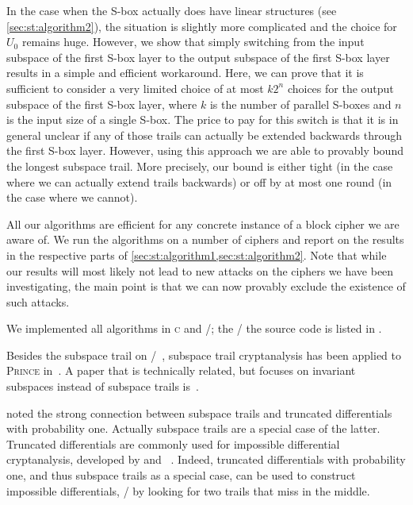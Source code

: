 In the case when the S-box actually does have linear structures (see \cref{sec:st:algorithm2}), the situation is slightly more complicated and the choice for $U_0$ remains huge.
However, we show that simply switching from the input subspace of the first S-box layer to the output subspace of the first S-box layer results in a simple and efficient workaround.
Here, we can prove that it is sufficient to consider a very limited choice of at most $k2^n$ choices for the output subspace of the first S-box layer, where $k$ is the number of parallel S-boxes and $n$ is the input size of a single S-box.
The price to pay for this switch is that it is in general unclear if any of those trails can actually be extended backwards through the first S-box layer.
However, using this approach we are able to provably bound the longest subspace trail.
More precisely, our bound is either tight (in the case where we can actually extend trails backwards) or off by at most one round (in the case where we cannot).

All our algorithms are efficient for any concrete instance of a block cipher we are aware of.
We run the algorithms on a number of ciphers and report on the results in the respective parts of \cref{sec:st:algorithm1,sec:st:algorithm2}.
Note that while our results will most likely not lead to new attacks on the ciphers we have been investigating, the main point is that we can now provably exclude the existence of such attacks.

We implemented all algorithms in \textsc{c} and \sage/; the \sage/ the source code is listed in
\cite[Appendix~A]{ToSC:LeaTezWie18}%
.

Besides the subspace trail on \AES/~\cite{EC:GraRecRon17}, subspace trail cryptanalysis has been applied to \textsc{Prince} in~\cite{INDOCRYPT:GraRec16}.
A paper that is technically related, but focuses on invariant subspaces instead of subspace trails is~\cite{EPRINT:LiuRij17}.

\textcite{ToSC:GraRecRon16} noted the strong connection between subspace trails and truncated differentials with probability one.
Actually subspace trails are a special case of the latter.
Truncated differentials are commonly used for impossible differential cryptanalysis, developed by \textcite{AES:deal} and \citeauthor{EC:BihBirSha99,FSE:BihBirSha99}~.
Indeed, truncated differentials with probability one, and thus subspace trails as a special case, can be used to construct impossible differentials, \eg/ by looking for two trails that miss in the middle.

